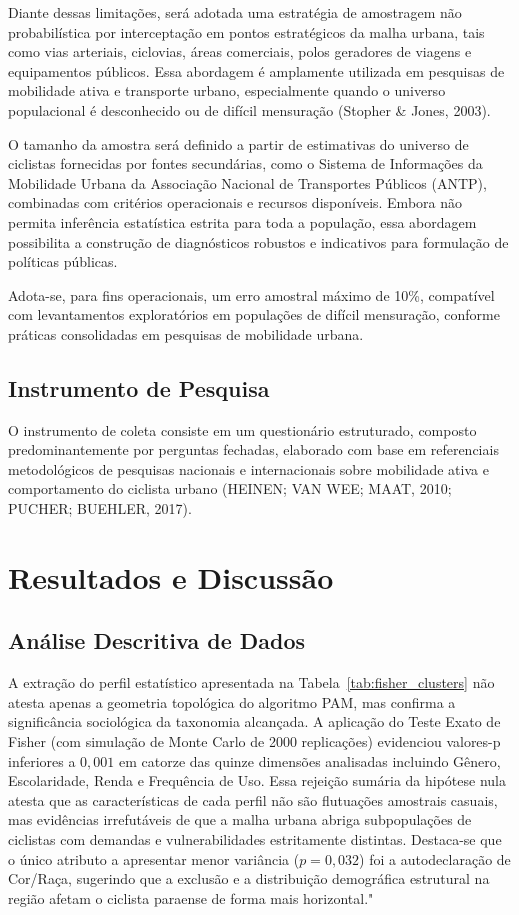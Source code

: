 \documentclass[12pt]{article}
\begin{document}
Diante dessas limitações, será adotada uma estratégia de amostragem não probabilística por interceptação em pontos estratégicos da malha urbana, tais como vias arteriais, ciclovias, áreas comerciais, polos geradores de viagens e equipamentos públicos. Essa abordagem é amplamente utilizada em pesquisas de mobilidade ativa e transporte urbano, especialmente quando o universo populacional é desconhecido ou de difícil mensuração (Stopher \& Jones, 2003).

O tamanho da amostra será definido a partir de estimativas do universo de ciclistas fornecidas por fontes secundárias, como o Sistema de Informações da Mobilidade Urbana da Associação Nacional de Transportes Públicos (ANTP), combinadas com critérios operacionais e recursos disponíveis. Embora não permita inferência estatística estrita para toda a população, essa abordagem possibilita a construção de diagnósticos robustos e indicativos para formulação de políticas públicas.

Adota-se, para fins operacionais, um erro amostral máximo de 10\%, compatível com levantamentos exploratórios em populações de difícil mensuração, conforme práticas consolidadas em pesquisas de mobilidade urbana.

\subsection{Instrumento de Pesquisa}

O instrumento de coleta consiste em um questionário estruturado, composto predominantemente por perguntas fechadas, elaborado com base em referenciais metodológicos de pesquisas nacionais e internacionais sobre mobilidade ativa e comportamento do ciclista urbano (HEINEN; VAN WEE; MAAT, 2010; PUCHER; BUEHLER, 2017).

\section{Resultados e Discussão}
\subsection{Análise Descritiva de Dados}

A extração do perfil estatístico apresentada na Tabela~\ref{tab:fisher_clusters} não atesta apenas a geometria topológica do algoritmo PAM, mas confirma a significância sociológica da taxonomia alcançada. A aplicação do Teste Exato de Fisher (com simulação de Monte Carlo de 2000 replicações) evidenciou valores-p inferiores a $0,001$ em catorze das quinze dimensões analisadas incluindo Gênero, Escolaridade, Renda e Frequência de Uso. Essa rejeição sumária da hipótese nula atesta que as características de cada perfil não são flutuações amostrais casuais, mas evidências irrefutáveis de que a malha urbana abriga subpopulações de ciclistas com demandas e vulnerabilidades estritamente distintas. Destaca-se que o único atributo a apresentar menor variância ($p = 0,032$) foi a autodeclaração de Cor/Raça, sugerindo que a exclusão e a distribuição demográfica estrutural na região afetam o ciclista paraense de forma mais horizontal."
\end{document}
